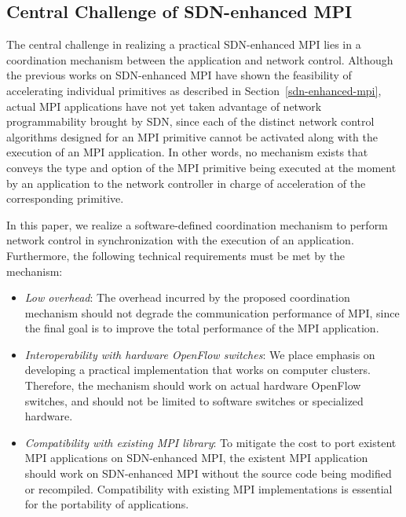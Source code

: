 \hypertarget{central-challenge-of-sdn-enhanced-mpi}{%
\subsection{Central Challenge of SDN-enhanced
MPI}\label{central-challenge-of-sdn-enhanced-mpi}}

The central challenge in realizing a practical SDN-enhanced MPI lies in
a coordination mechanism between the application and network control.
Although the previous works on SDN-enhanced MPI have shown the
feasibility of accelerating individual primitives as described in
Section~\ref{sdn-enhanced-mpi}, actual MPI applications have not yet
taken advantage of network programmability brought by SDN, since each of
the distinct network control algorithms designed for an MPI primitive
cannot be activated along with the execution of an MPI application. In
other words, no mechanism exists that conveys the type and option of the
MPI primitive being executed at the moment by an application to the
network controller in charge of acceleration of the corresponding
primitive.

In this paper, we realize a software-defined coordination mechanism to
perform network control in synchronization with the execution of an
application. Furthermore, the following technical requirements must be
met by the mechanism:

\begin{itemize}
\setlength{\itemsep}{1em}
\item
  \emph{Low overhead}: The overhead incurred by the proposed coordination
  mechanism should not degrade the communication performance of MPI, since the
  final goal is to improve the total performance of the MPI application.
\item
  \emph{Interoperability with hardware OpenFlow switches}: We place emphasis
  on developing a practical implementation that works on computer clusters.
  Therefore, the mechanism should work on actual hardware OpenFlow switches,
  and should not be limited to software switches or specialized hardware.
\item
  \emph{Compatibility with existing MPI library}: To mitigate the
  cost to port existent MPI applications on SDN-enhanced MPI, the existent MPI
  application should work on SDN-enhanced MPI without the source code being
  modified or recompiled. Compatibility with existing MPI implementations is
  essential for the portability of applications.
\end{itemize}


